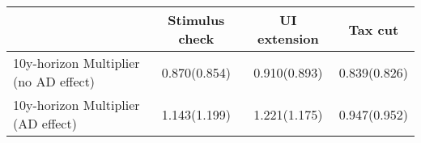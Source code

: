 \begin{tabular}{@{}lccc@{}} 
\toprule 
& Stimulus check    & UI extension    & Tax cut     \\  \midrule 
10y-horizon Multiplier (no AD effect)  &0.870(0.854)  & 0.910(0.893)  & 0.839(0.826)     \\ 
10y-horizon Multiplier (AD effect) &1.143(1.199)  & 1.221(1.175)  & 0.947(0.952)     \\ \bottomrule
\end{tabular}  
